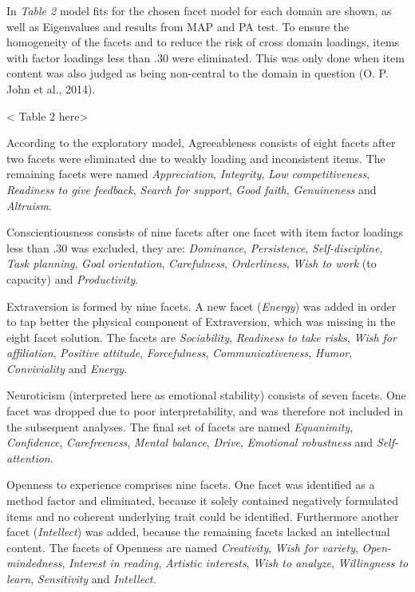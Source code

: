 \documentclass[,man,floatsintext]{apa6}
\begin{document}
In \emph{Table 2} model fits for the chosen facet model for each domain
are shown, as well as Eigenvalues and results from MAP and PA test. To
ensure the homogeneity of the facets and to reduce the risk of cross
domain loadings, items with factor loadings less than .30 were
eliminated. This was only done when item content was also judged as
being non-central to the domain in question (O. P. John et al., 2014).

\vspace{5mm}

\textless{} Table 2 here\textgreater{}

\vspace{5mm}

According to the exploratory model, Agreeableness consists of eight
facets after two facets were eliminated due to weakly loading and
inconsistent items. The remaining facets were named \emph{Appreciation},
\emph{Integrity}, \emph{Low competitiveness}, \emph{Readiness to give
feedback}, \emph{Search for support}, \emph{Good faith},
\emph{Genuineness} and \emph{Altruism}.

Conscientiousness consists of nine facets after one facet with item
factor loadings less than .30 was excluded, they are: \emph{Dominance},
\emph{Persistence}, \emph{Self-discipline}, \emph{Task planning},
\emph{Goal orientation}, \emph{Carefulness}, \emph{Orderliness},
\emph{Wish to work} (to capacity) and \emph{Productivity}.

Extraversion is formed by nine facets. A new facet (\emph{Energy}) was
added in order to tap better the physical component of Extraversion,
which was missing in the eight facet solution. The facets are
\emph{Sociability}, \emph{Readiness to take risks}, \emph{Wish for
affiliation}, \emph{Positive attitude}, \emph{Forcefulness},
\emph{Communicativeness}, \emph{Humor}, \emph{Conviviality} and
\emph{Energy}.

Neuroticism (interpreted here as emotional stability) consists of seven
facets. One facet was dropped due to poor interpretability, and was
therefore not included in the subsequent analyses. The final set of
facets are named \emph{Equanimity}, \emph{Confidence},
\emph{Carefreeness}, \emph{Mental balance}, \emph{Drive},
\emph{Emotional robustness} and \emph{Self-attention}.

Openness to experience comprises nine facets. One facet was identified
as a method factor and eliminated, because it solely contained
negatively formulated items and no coherent underlying trait could be
identified. Furthermore another facet (\emph{Intellect}) was added,
because the remaining facets lacked an intellectual content. The facets
of Openness are named \emph{Creativity}, \emph{Wish for variety},
\emph{Open-mindedness}, \emph{Interest in reading}, \emph{Artistic
interests}, \emph{Wish to analyze}, \emph{Willingness to learn},
\emph{Sensitivity} and \emph{Intellect.}
\end{document}
